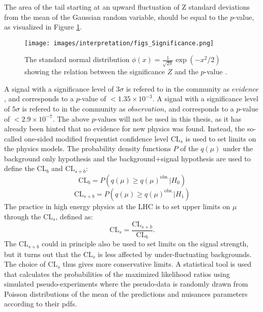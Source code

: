 The area of the tail starting at an upward fluctuation of Z standard deviations from the mean of the Gaussian random variable, should be equal to the $p$-value, as visualized in Figure \ref{fig:pvalue}.
\begin{figure}[!hbtp]
\centering
\texttt{[image: images/interpretation/figs\_Significance.png]}
\caption{The standard normal distribution $\phi(x)=\frac{1}{\sqrt{2\pi}}\exp(-x^{2}/2)$ showing the relation between the significance $Z$ and the $p$-value \cite{Cowan:2010js}.}
\label{fig:pvalue}
\end{figure}
A signal with a significance level of $3\sigma$ is refered to in the community as $evidence$, and corresponds to a $p$-value of $<1.35\times10^{-3}$. 
A signal with a significance level of $5\sigma$ is refered to in the community as $observation$, and corresponds to a $p$-value of $<2.9\times10^{-7}$. 
The above $p$-values will not be used in this thesis, as it has already been hinted that no evidence for new physics was found. 
Instead, the so-called one-sided modified frequentist confidence level $\mathrm{CL}_{s}$ is used to set limits on the physics models.                                                                 
The probability density functions $P$ of the $q(\mu)$ under the background only hypothesis and the background+signal hypothesis are used to define the $\mathrm{CL}_{b}$ and $\mathrm{CL}_{s+b}$:
\begin{equation}
\mathrm{CL}_{b}=P(q(\mu)\geq q(\mu)^{\mathrm{obs.}}|H_{0})
\end{equation} 
\begin{equation}
\mathrm{CL}_{s+b}=P(q(\mu)\geq q(\mu)^{\mathrm{obs.}}|H_{1})
\end{equation} 
The practice in high energy physics at the LHC is to set upper limits on $\mu$ through the $\mathrm{CL}_{s}$, defined as:
\begin{equation}
\mathrm{CL}_{s}=\frac{\mathrm{CL}_{s+b}}{\mathrm{CL}_{b}}.
\end{equation} 
The $\mathrm{CL}_{s+b}$ could in principle also be used to set limits on the signal strength, but it turns out that the $\mathrm{CL}_{s}$ is less affected by under-fluctuating backgrounds. 
The choice of $\mathrm{CL}_{s}$ thus gives more conservative limits. 
A statistical tool is used that calculates the probabilities of the maximized likelihood ratios using simulated pseudo-experiments where the pseudo-data is randomly drawn from Poisson distributions of the mean of the predictions and nuisances parameters according to their pdfs. 
